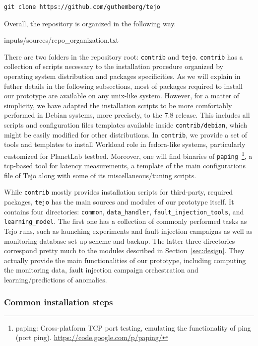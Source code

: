 \begin{lstlisting}
git clone https://github.com/guthemberg/tejo
\end{lstlisting}


Overall, the repository is organized in the following way.

  {inputs/sources/repo_organization.txt}

There are two folders in the repository root: \verb|contrib| and \verb|tejo|. \verb|contrib| has a collection of scripts necessary to the installation procedure organized by operating system distribution and packages specificities. As we will explain in futher details in the following subsections, most of packages required to install our prototype are available on any unix-like system. However, for a matter of simplicity, we have adapted the installation scripts to be more comfortably performed in Debian systems, more precisely, to the 7.8 release. This includes all scripts and configuration files templates available inside \verb|contrib/debian|, which might be easily modified for other distributions. In \verb|contrib|, we provide a set of tools and templates to install Workload role in fedora-like systems, particularly customized for PlanetLab testbed. Moreover, one will find binaries of \verb|paping|~\footnote{paping: Cross-platform TCP port testing, emulating the functionality of ping (port ping). \url{https://code.google.com/p/paping/}}, a tcp-based tool for latency measurements, a template of the main configurations file of Tejo along with some of its miscellaneous/tuning scripts.

While \verb|contrib|  mostly provides installation scripts for third-party, required packages, \verb|tejo| has the main sources and modules of our prototype itself. It contains four directories: \verb|common|, \verb|data_handler|, \verb|fault_injection_tools|, and \verb|learning_model|. The first one has a collection of commonly performed tasks as Tejo runs, such as launching experiments and fault injection campaigns as well as monitoring database set-up scheme and backup. The latter three directories correspond pretty much to the modules described in Section~\ref{sec:design}. They actually provide the main functionalities of our prototype, including computing the monitoring data, fault injection campaign orchestration and learning/predictions of anomalies.

\subsubsection{Common installation steps}

